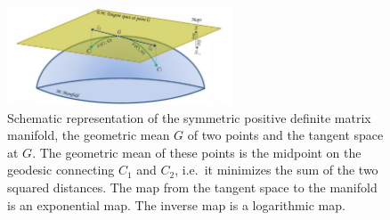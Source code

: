\begin{figure}[h]
    \centering
    \includegraphics[width=0.6\textwidth]{img/riemannian-tangent-space.png}
    \caption{Schematic representation of the symmetric positive definite matrix manifold, the geometric mean $G$ of two points and the tangent space at $G$. The geometric mean of these points is the midpoint on the geodesic connecting $C_1$ and $C_2$, i.e.\ it minimizes the sum of the two squared distances. The map from the tangent space to the manifold is an exponential map. The inverse map is a logarithmic map.}\label{figure:tangent-space}
\end{figure}
